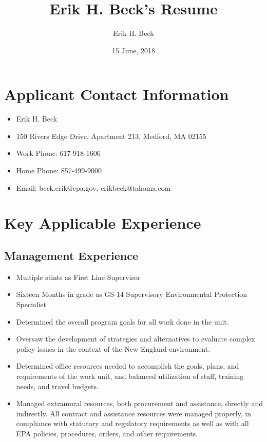 \documentclass[12pt]{article}
\begin{document}
\title{Erik H. Beck's Resume}
\author{Erik H. Beck}
\date{15 June, 2018}
\maketitle

\tableofcontents

\setlength{\baselineskip}{10pt}
\section{Applicant Contact Information}

\begin{itemize}
\item
  Erik H. Beck
\item
  150 Rivers Edge Drive, Apartment 213, Medford, MA 02155
\item
  Work Phone: 617-918-1606
\item
  Home Phone: 857-499-9000
\item
  Email: beck.erik@epa.gov, erikbeck@tahoma.com
\end{itemize}

\section{Key Applicable Experience}

\subsection{Management Experience}
\begin{itemize}
\item
  Multiple stints as First Line Supervisor
\item
  Sixteen Months in grade as GS-14 Supervisory Environmental Protection Specialist
\item Determined the overall program goals for all work done in the unit.
\item Oversaw the development of strategies and alternatives to evaluate complex policy issues in the context of the New England environment.
\item Determined office resources needed to accomplish the goals, plans, and requirements of the work unit, and balanced utilization of staff, training needs, and travel budgets.
\item
  Managed extramural resources, both procurement and assistance,
  directly and indirectly.  All contract and assistance resources were
  managed properly, in compliance with statutory and regulatory
  requirements as well as with all EPA policies, procedures, orders,
  and other requirements.
\end{itemize}
\end{document}
